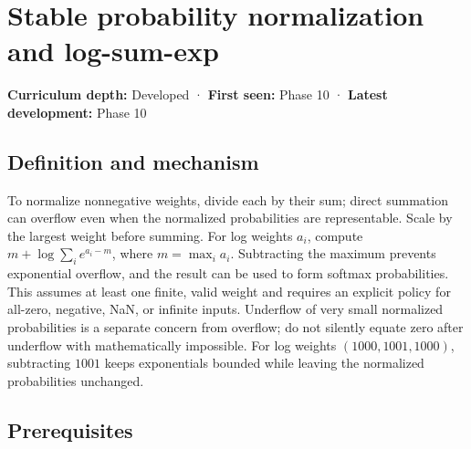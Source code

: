 \hypertarget{appendix-d580b422240f}{}\label{referencestart:appendix-d580b422240f}
\section{Stable probability normalization and log-sum-exp}\label{appendix-d580b422240f-stable-probability-normalization-and-log-sum-exp}

\hypertarget{appendix-d580b422240f-stable-probability-normalization-and-log-sum-exp}{}

\textbf{Curriculum depth:} Developed · \textbf{First seen:} Phase 10 · \textbf{Latest development:} Phase 10

\begin{allmightroledefinition}

\subsection{Definition and mechanism}\label{appendix-d580b422240f-definition-and-mechanism}

\hypertarget{appendix-d580b422240f-definition-and-mechanism}{}

To normalize nonnegative weights, divide each by their sum; direct summation can overflow even when the normalized probabilities are representable. Scale by the largest weight before summing. For log weights \(a_i\), compute \(m+\log\sum_i e^{a_i-m}\), where \(m=\max_i a_i\). Subtracting the maximum prevents exponential overflow, and the result can be used to form softmax probabilities. This assumes at least one finite, valid weight and requires an explicit policy for all-zero, negative, NaN, or infinite inputs. Underflow of very small normalized probabilities is a separate concern from overflow; do not silently equate zero after underflow with mathematically impossible. For log weights \((1000,1001,1000)\), subtracting \(1001\) keeps exponentials bounded while leaving the normalized probabilities unchanged.

\end{allmightroledefinition}

\subsection{Prerequisites}\label{appendix-d580b422240f-prerequisites}

\hypertarget{appendix-d580b422240f-prerequisites}{}

